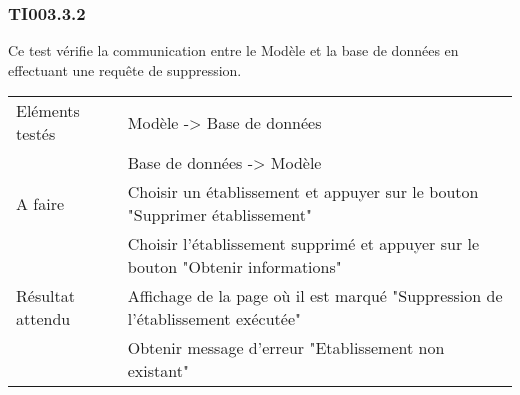   		
  	\subsubsection{TI003.3.2}
  		Ce test vérifie la communication entre le Modèle et la base de données en effectuant une requête de suppression.
  		\begin{center}
    	 		\begin{tabular}[h]{|p{}|p{}|}
			\hline
				Eléments testés & Modèle -> Base de données  \\
							    &  Base de données -> Modèle \\\hline
    				A faire & Choisir un établissement et appuyer sur le bouton "Supprimer établissement" \\
    						& Choisir l'établissement supprimé et appuyer sur le bouton "Obtenir informations" \\\hline
    				Résultat attendu & Affichage de la page où il est marqué "Suppression de l'établissement exécutée" \\  								 & Obtenir message d'erreur "Etablissement non existant" \\\hline
     		\end{tabular}
  		\end{center}	
  	
  		